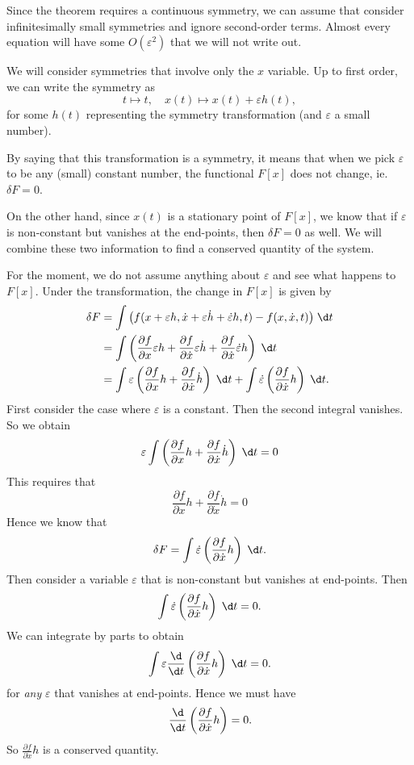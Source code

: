 \documentclass[a4paper]{article}
\begin{document}
Since the theorem requires a continuous symmetry, we can assume that consider infinitesimally small symmetries and ignore second-order terms. Almost every equation will have some $O(\varepsilon^2)$ that we will not write out.

We will consider symmetries that involve only the $x$ variable. Up to first order, we can write the symmetry as
\[
  t \mapsto t,\quad x(t)\mapsto x(t) + \varepsilon h(t),
\]
for some $h(t)$ representing the symmetry transformation (and $\varepsilon$ a small number).

By saying that this transformation is a symmetry, it means that when we pick $\varepsilon$ to be any (small) constant number, the functional $F[x]$ does not change, ie. $\delta F = 0$.

On the other hand, since $x(t)$ is a stationary point of $F[x]$, we know that if $\varepsilon$ is non-constant but vanishes at the end-points, then $\delta F = 0$ as well. We will combine these two information to find a conserved quantity of the system.

For the moment, we do not assume anything about $\varepsilon$ and see what happens to $F[x]$. Under the transformation, the change in $F[x]$ is given by
\begin{align*}
  \delta F &= \int \big(f(x + \varepsilon h, \dot{x} + \varepsilon \dot{h} + \dot{\varepsilon} h, t) - f(x, \dot{x}, t)\big)\;\d t\\
  &= \int\left(\frac{\partial f}{\partial x}\varepsilon h + \frac{\partial f}{\partial \dot{x}}\varepsilon \dot{h} + \frac{\partial f}{\partial \dot{x}}\dot{\varepsilon} h\right)\;\d t\\
  &= \int \varepsilon\left(\frac{\partial f}{\partial x}h + \frac{\partial f}{\partial \dot{x}}\dot{h}\right)\;\d t + \int \dot{\varepsilon} \left(\frac{\partial f}{\partial \dot{x}}h\right)\;\d t.
\end{align*}
First consider the case where $\varepsilon$ is a constant. Then the second integral vanishes. So we obtain
\[
  \varepsilon \int \left(\frac{\partial f}{\partial x}h + \frac{\partial f}{\partial\dot{x}}\dot{h}\right)\;\d t = 0
\]
This requires that
\[
  \frac{\partial f}{\partial x}h + \frac{\partial f}{\partial\dot{x}}\dot{h} = 0
\]
Hence we know that
\[
  \delta F = \int\dot{\varepsilon}\left(\frac{\partial f}{\partial \dot{x}}h\right)\;\d t.
\]
Then consider a variable $\varepsilon$ that is non-constant but vanishes at end-points. Then
\[
  \int\dot{\varepsilon}\left(\frac{\partial f}{\partial \dot{x}}h\right)\;\d t = 0.
\]
We can integrate by parts to obtain
\[
  \int \varepsilon \frac{\d}{\d t}\left(\frac{\partial f}{\partial \dot{x}}h\right)\;\d t = 0.
\]
for \emph{any} $\varepsilon$ that vanishes at end-points. Hence we must have
\[
  \frac{\d}{\d t}\left(\frac{\partial f}{\partial \dot{x}}h\right) = 0.
\]
So $\frac{\partial f}{\partial \dot{x}}h$ is a conserved quantity.
\end{document}
